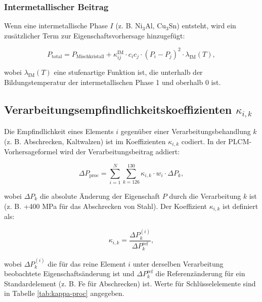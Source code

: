 \documentclass[12pt,a4paper]{article}
\begin{document}
\subsubsection{Intermetallischer Beitrag}
Wenn eine intermetallische Phase \(I\) (z. B. Ni\(_3\)Al, Cu\(_3\)Sn) entsteht, wird ein zusätzlicher Term zur Eigenschaftsvorhersage hinzugefügt:

\begin{equation}
	P_{\text{total}} = P_{\text{Mischkristall}} + \kappa_{ij}^{\text{IM}} \cdot c_i c_j \cdot (P_i - P_j)^2 \cdot \lambda_{\text{IM}}(T),
	\label{eq:intermetallic-term}
\end{equation}

wobei \(\lambda_{\text{IM}}(T)\) eine stufenartige Funktion ist, die unterhalb der Bildungstemperatur der intermetallischen Phase 1 und oberhalb 0 ist.

\subsection{Verarbeitungsempfindlichkeitskoeffizienten \(\kappa_{i,k}\)}
\label{subsec:processing-coefficients}

Die Empfindlichkeit eines Elements \(i\) gegenüber einer Verarbeitungsbehandlung \(k\) (z. B. Abschrecken, Kaltwalzen) ist im Koeffizienten \(\kappa_{i,k}\) codiert. In der PLCM-Vorhersageformel wird der Verarbeitungsbeitrag addiert:

\begin{equation}
	\Delta P_{\text{proc}} = \sum_{i=1}^{N} \sum_{k=126}^{130} \kappa_{i,k} \cdot w_i \cdot \Delta P_k,
	\label{eq:proc-contribution}
\end{equation}

wobei \(\Delta P_k\) die absolute Änderung der Eigenschaft \(P\) durch die Verarbeitung \(k\) ist (z. B. +400 MPa für das Abschrecken von Stahl). Der Koeffizient \(\kappa_{i,k}\) ist definiert als:

\begin{equation}
	\kappa_{i,k} = \frac{\Delta P_k^{(i)}}{\Delta P_k^{\text{ref}}},
	\label{eq:kappa-proc-def}
\end{equation}

wobei \(\Delta P_k^{(i)}\) die für das reine Element \(i\) unter derselben Verarbeitung beobachtete Eigenschaftsänderung ist und \(\Delta P_k^{\text{ref}}\) die Referenzänderung für ein Standardelement (z. B. Fe für Abschrecken) ist. Werte für Schlüsselelemente sind in Tabelle \ref{tab:kappa-proc} angegeben.
\end{document}
